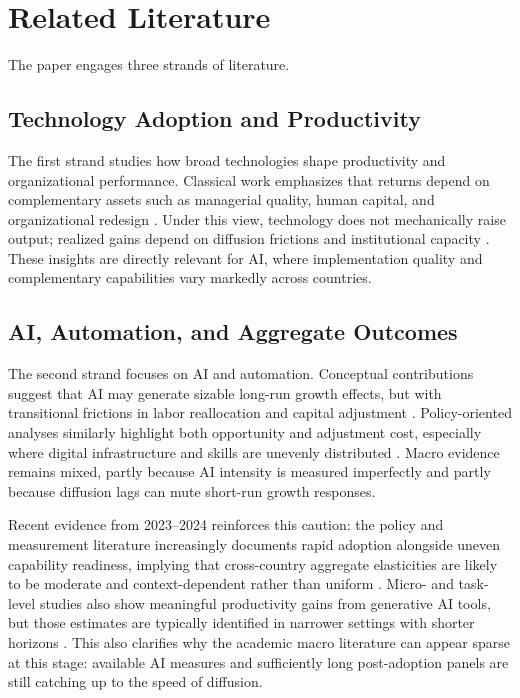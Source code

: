 \section{Related Literature}

The paper engages three strands of literature.

\subsection{Technology Adoption and Productivity}

The first strand studies how broad technologies shape productivity and organizational performance. Classical work emphasizes that returns depend on complementary assets such as managerial quality, human capital, and organizational redesign \cite{brynjolfssonHitt2000,griliches1998}. Under this view, technology does not mechanically raise output; realized gains depend on diffusion frictions and institutional capacity \cite{bresnahanTrajtenberg1995,cominMestieri2018}. These insights are directly relevant for AI, where implementation quality and complementary capabilities vary markedly across countries.

\subsection{AI, Automation, and Aggregate Outcomes}

The second strand focuses on AI and automation. Conceptual contributions suggest that AI may generate sizable long-run growth effects, but with transitional frictions in labor reallocation and capital adjustment \cite{acemogluRestrepo2018,brynjolfssonRockSyverson2019,aghionJonesJones2017,acemogluAutor2011}. Policy-oriented analyses similarly highlight both opportunity and adjustment cost, especially where digital infrastructure and skills are unevenly distributed \cite{imf2024,oecd2023ai,korinekStiglitz2021}. Macro evidence remains mixed, partly because AI intensity is measured imperfectly and partly because diffusion lags can mute short-run growth responses.

Recent evidence from 2023--2024 reinforces this caution: the policy and measurement literature increasingly documents rapid adoption alongside uneven capability readiness, implying that cross-country aggregate elasticities are likely to be moderate and context-dependent rather than uniform \cite{oecd2023ai,imf2024}. Micro- and task-level studies also show meaningful productivity gains from generative AI tools, but those estimates are typically identified in narrower settings with shorter horizons \cite{noyZhang2023,brynjolfssonLiRaymond2023,eloundouEtAl2023}. This also clarifies why the academic macro literature can appear sparse at this stage: available AI measures and sufficiently long post-adoption panels are still catching up to the speed of diffusion.

